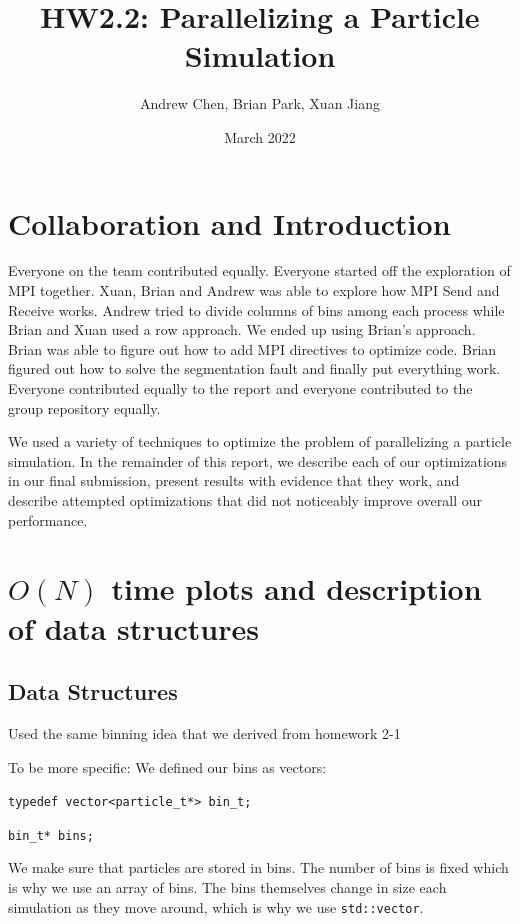\documentclass{article}
\title{HW2.2: Parallelizing a Particle Simulation}
\author{Andrew Chen, Brian Park, Xuan Jiang}
\date{March 2022}
\begin{document}
\maketitle
\section{Collaboration and Introduction}
Everyone on the team contributed equally. Everyone started off the exploration of MPI together. Xuan, Brian and Andrew was able to explore how MPI Send and Receive works. Andrew tried to divide columns of bins among each process while Brian and Xuan used a row approach. We ended up using Brian's approach. Brian was able to figure out how to add MPI directives to optimize code. Brian figured out how to solve the segmentation fault and finally put everything work. Everyone contributed equally to the report and everyone contributed to the group repository equally.

We used a variety of techniques to optimize the problem of parallelizing a particle simulation.
In the remainder of this report, we describe each of our optimizations in our final submission,
present results with evidence that they work, and describe attempted optimizations that did not
noticeably improve overall our performance.

\section{$O(N)$ time plots and description of data structures} 

\subsection{Data Structures}
Used the same binning idea that we derived from homework 2-1

To be more specific:
We defined our bins as vectors:

\verb|typedef vector<particle_t*> bin_t;|

\verb|bin_t* bins;|

We make sure that particles are stored in bins. The number of bins is fixed which is why we use an array of bins. The bins themselves
change in size each simulation as they move around, which is why we use \verb|std::vector|.
\end{document}
